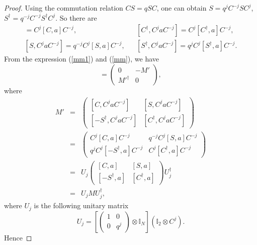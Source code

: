 \documentclass[a4paper,11pt]{article}
\begin{document}
\begin{proof}
  Using the commutation relation $CS = qSC$, one can obtain $S = q^j C^{- j}
  SC^j$, $S^{\dag} = q^{- j} C^{- j} S^{\dag} C^j$. So there are
  \begin{eqnarray}
    [C, C^j a C^{- j}] = C^j  [C, a] C^{- j}, && [C^{\dag}, C^j a C^{- j}]
    = C^j  [C^{\dag}, a] C^{- j},
\nonumber\\{}
    [S, C^j a C^{- j}] = q^{- j} C^j  [S, a] C^{- j}, && [S^{\dag}, C^j a
    C^{- j}] = q^j C^j  [S^{\dag}, a] C^{- j}.
  \end{eqnarray}
From the expression (\ref{mm1}) and (\ref{mm}), we have
  \begin{equation}
    [D_1, C^j a C^{- j}] = \left( \begin{array}{cc}
      0 & - M'\\
      {M'}^{\dag} & 0
    \end{array} \right),
  \end{equation}
where
  \begin{eqnarray}
    M' & = & \left( \begin{array}{cc}
      [C, C^j aC^{- j}] & [S, C^j aC^{- j}]\\{}
      [- S^{\dag}, C^j aC^{- j}] & [C^{\dag}, C^j aC^{- j}]
    \end{array} \right) \nonumber\\
    & = & \left( \begin{array}{cc}
      C^j [C, a] C^{- j} & q^{- j} C^j [S, a] C^{- j}\\
      q^j C^j [- S^{\dag}, a] C^{- j} & C^j [C^{\dag}, a] C^{- j}
    \end{array} \right) \nonumber\\
    & = & U_j \left( \begin{array}{cc}
      [C, a] & [S, a]\\
      {}[- S^{\dag}, a] & [C^{\dag}, a]
    \end{array} \right) U_j^{\dag} \nonumber\\
    & = & U_j MU_j^{\dag}, 
  \end{eqnarray}
  where $U_j$ is the following unitary matrix
  \begin{equation}
    U_j = \left[ \left( \begin{array}{cc}
      1 & 0\\
      0 & q^j
    \end{array} \right) \otimes \mathbb{I}_N \right]  (\mathbb{I}_2 \otimes
    C^j) .
  \end{equation}
  Hence

\end{proof}
\end{document}
